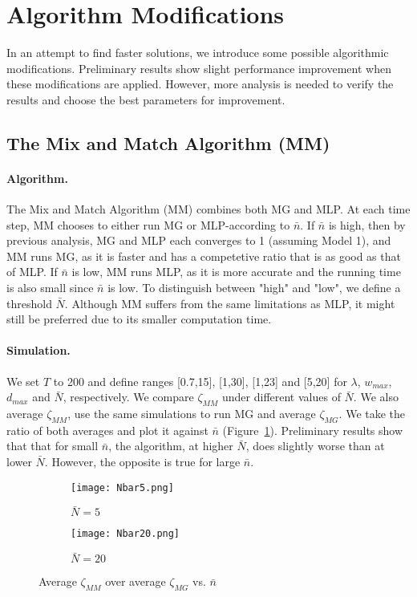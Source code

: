 \documentclass[oribibl]{llncs}
\begin{document}
\section{Algorithm Modifications}
\label{sec:AM}


 In an attempt to find faster solutions, we introduce some possible algorithmic
 modifications. Preliminary results show slight performance improvement when these
 modifications are applied. However, more analysis is needed to verify
 the results and choose the best parameters for improvement.

\subsection {The Mix and Match Algorithm (MM)}
\label{subsec:MM}

\paragraph{Algorithm.} The Mix and Match Algorithm (MM) combines 
both MG and MLP. At each time step, MM chooses to either
run MG or MLP-according to $\bar{n}$. If $\bar{n}$ is high, then by
previous analysis, MG and MLP each converges to 1 (assuming Model
1), and MM runs MG, as it is faster and has a competetive ratio that
is as good as that of MLP. If $\bar{n}$
is low, MM runs MLP, as it is more accurate and the running time is
also small since $\bar{n}$ is low.
To distinguish between "high" and "low", we define a
threshold $\bar{N}$. Although MM suffers from the same limitations as
MLP, it might still be preferred due to its smaller computation time. 

\paragraph {Simulation.} We set $T$ to 200 and define ranges [0.7,15], [1,30], [1,23] and [5,20] for $\lambda$, $w_{max}$, $d_{max}$ and $\bar{N}$, respectively. We compare $\zeta_{MM}$ under different values of $\bar{N}$. We also average $\zeta_{MM}$, use the same simulations to run MG and average $\zeta_{MG}$. We take the ratio of both averages and plot it against $\bar{n}$ (Figure~\ref{fig:MMvsMG}). Preliminary results show that that for small $\bar{n}$, the algorithm, at higher $\bar{N}$, does slightly worse than at lower $\bar{N}$. However, the opposite is true for large $\bar{n}$. 

\begin{figure}[h!]\centering
\begin{subfigure}{.46\textwidth}
  \centering
  \texttt{[image: Nbar5.png]}
  \caption{$\bar{N}=5$}
\end{subfigure}
\hfill
\begin{subfigure}{.46\textwidth}
  \centering
  \texttt{[image: Nbar20.png]}
  \caption{$\bar{N}=20$}
\end{subfigure}
\caption{Average $\zeta_{MM}$ over average $\zeta_{MG}$ vs. $\bar{n}$}
\label{fig:MMvsMG}
\end{figure}
\end{document}
